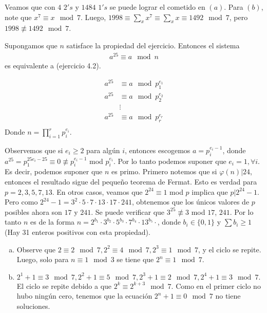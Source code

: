 \begin{sol}
	Veamos que con $4$ $2's$ y $1484$ $1's$ se puede lograr el cometido en $(a)$. Para $(b)$, note que $x^{7} \equiv x \mod 7$. Luego, $1998 \equiv \sum_{x} x^{7} \equiv \sum_{x} x \equiv 1492 \mod 7$, pero $1998 \not\equiv 1492 \mod 7$.
\end{sol}

\begin{sol}
	Supongamos que $n$ satisface la propiedad del ejercicio. Entonces el sistema
	\begin{align}
	a^{25} \equiv a \mod n
	\end{align}
	es equivalente a (ejercicio 4.2).
	
	\begin{align}
	a^{25} &\equiv a \mod p_{1}^{e_{1}} \\
	a^{25} &\equiv a \mod p_{2}^{e_{2}} \\
	  &\vdots \\
	a^{25} &\equiv a \mod p_{r}^{e_{r}} \\
	\end{align}
	Donde $n = \prod_{i=1}^{r}p_{i}^{e_{i}}$.
	
	Observemos que si $e_{i} \geq 2$ para alg\'un $i$, entonces escogemos $a = p_{i}^{e_{i}-1}$, donde $a^{25} = p_{1}^{25e_{i}-25} \equiv 0 \not\equiv p_{i}^{e_{i}-1}$ mod $p_{i}^{e_{i}}$. Por lo tanto podemos suponer que $e_{i} =1, \forall i$. Es decir, podemos suponer que $n$ es primo. Primero notemos que si $\varphi(n)|24$, entonces el resultado sigue del pequeño teorema de Fermat. Esto es verdad para $p = 2, 3, 5, 7, 13$. En otros casos, veamos que $2^ {24} \equiv 1$ mod $p$ implica que $p | 2^{24}-1$. Pero como $2^{24}-1 = 3^2\cdot 5 \cdot 7 \cdot 13 \cdot 17 \cdot 241$, obtenemos que los \'unicos valores de $p$ posibles ahora son $17$ y $241$. Se puede verificar que $3^{25} \not\equiv 3 $ mod $17$, $241$. Por lo tanto $n$ es de la forma $n = 2^{b_{1}}\cdot3^{b_{2}}\cdot5^{b_{3}}\cdot7^{b_{4}}\cdot13^{b_{5}}\cdot$, donde $b_{i} \in \{0, 1\}$ y $\sum b_{i} \geq 1$ (Hay 31 enteros positivos con esta propiedad).

	

\end{sol}

\begin{sol}
	\begin{enumerate}[a.]
		\item Observe que $2 \equiv 2 \mod 7, 2^2 \equiv 4 \mod 7, 2^3 \equiv 1 \mod 7$, y el ciclo se repite. Luego, solo para $n \equiv 1 \mod 3 $ se tiene que $2^n \equiv 1 \mod 7$.
		\item$ 2^1 +1 \equiv 3 \mod 7, 2^2+1 \equiv 5 \mod 7, 2^3 +1 \equiv 2 \mod 7, 2^4+1 \equiv 3 \mod 7. $ El ciclo se repite debido a que $2^k \equiv 2^{k+3} \mod 7$. Como en el primer ciclo no hubo ning\'un cero, tenemos que la ecuaci\'on $2^n +1 \equiv 0 \mod 7 $ no tiene soluciones.
	\end{enumerate}
\end{sol}

